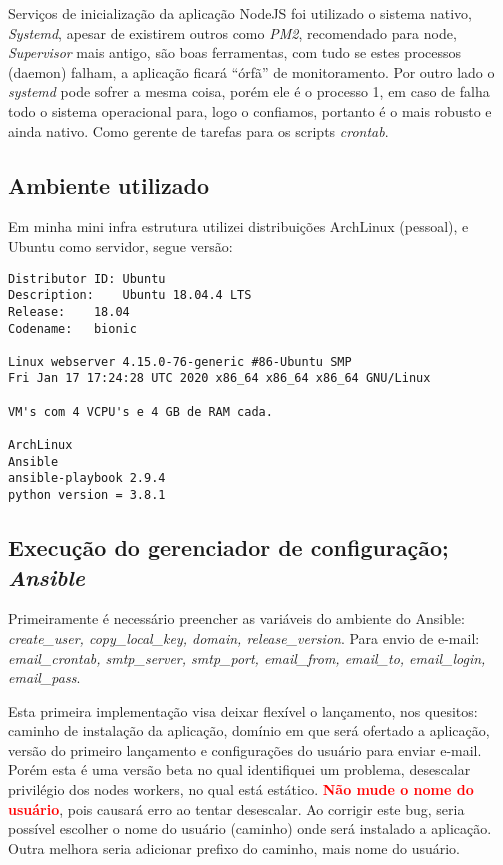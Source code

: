Serviços de inicialização da aplicação NodeJS foi utilizado o sistema
nativo, \emph{Systemd}, apesar de existirem outros como \emph{PM2},
recomendado para node, \emph{Supervisor} mais antigo, são boas
ferramentas, com tudo se estes processos (daemon) falham, a aplicação ficará
``órfã'' de monitoramento. Por outro lado o \emph{systemd} pode sofrer
a mesma coisa, porém ele é o processo 1, em caso de falha todo o
sistema operacional para, logo o confiamos, portanto é o mais robusto e
ainda nativo. Como gerente de tarefas para os scripts \emph{crontab}.


\subsection{Ambiente utilizado}
Em minha mini infra estrutura utilizei distribuições ArchLinux (pessoal), e
Ubuntu como servidor, segue versão:

\begin{verbatim}
Distributor ID:	Ubuntu
Description:	Ubuntu 18.04.4 LTS
Release:	18.04
Codename:	bionic

Linux webserver 4.15.0-76-generic #86-Ubuntu SMP
Fri Jan 17 17:24:28 UTC 2020 x86_64 x86_64 x86_64 GNU/Linux

VM's com 4 VCPU's e 4 GB de RAM cada.

ArchLinux
Ansible
ansible-playbook 2.9.4
python version = 3.8.1
\end{verbatim}


\subsection{Execução do gerenciador de configuração; \emph{Ansible}} \label{sec:playbook}
Primeiramente é necessário preencher as variáveis do ambiente do
Ansible: \emph{create\_user, copy\_local\_key, domain,
  release\_version}. Para envio de e-mail: \emph{email\_crontab,
  smtp\_server, smtp\_port, email\_from, email\_to, email\_login,
  email\_pass}.

Esta primeira implementação visa deixar flexível o lançamento,
nos quesitos: caminho de instalação da aplicação, domínio em que será
ofertado a aplicação, versão do primeiro lançamento e configurações
do usuário para enviar e-mail. Porém esta é uma versão beta no qual
identifiquei um problema, desescalar privilégio dos nodes workers,
no qual está estático. \textcolor{red}{\textbf{Não mude o nome do
    usuário}}, pois causará erro ao tentar desescalar. Ao corrigir
este bug, seria possível escolher o nome do usuário (caminho) onde
será instalado a aplicação. Outra melhora seria adicionar prefixo do
caminho, mais nome do usuário.

